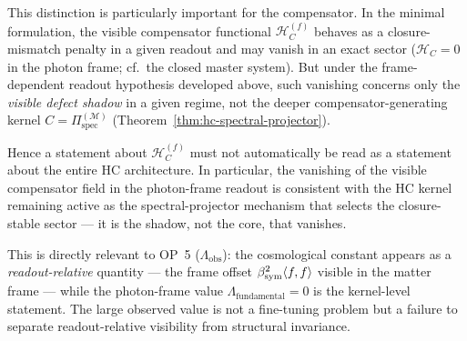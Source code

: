\begin{remark}
\label{rem:hc-shadow-vs-core}
This distinction is particularly important for the compensator.
In the minimal formulation, the visible compensator functional
$\mathcal{H}_C^{(f)}$ behaves as a closure-mismatch penalty in a given
readout and may vanish in an exact sector ($\mathcal{H}_C = 0$ in the
photon frame; cf.\ the closed master system). But under the
frame-dependent readout hypothesis developed above, such vanishing
concerns only the \emph{visible defect shadow} in a given regime, not
the deeper compensator-generating kernel
$C = \Pi^{(\mathcal{M})}_{\mathrm{spec}}$
(Theorem~\ref{thm:hc-spectral-projector}).

Hence a statement about $\mathcal{H}_C^{(f)}$ must not automatically be
read as a statement about the entire HC architecture. In particular, the
vanishing of the visible compensator field in the photon-frame readout
is consistent with the HC kernel remaining active as the
spectral-projector mechanism that selects the closure-stable sector ---
it is the shadow, not the core, that vanishes.

This is directly relevant to OP~5 ($\Lambda_{\mathrm{obs}}$): the
cosmological constant appears as a \emph{readout-relative} quantity ---
the frame offset $\beta_{\mathrm{sym}}^2\langle f,f\rangle$ visible in the matter frame
--- while the photon-frame value $\Lambda_{\mathrm{fundamental}} = 0$
is the kernel-level statement. The large observed value is not a
fine-tuning problem but a failure to separate readout-relative visibility
from structural invariance.
\end{remark}


